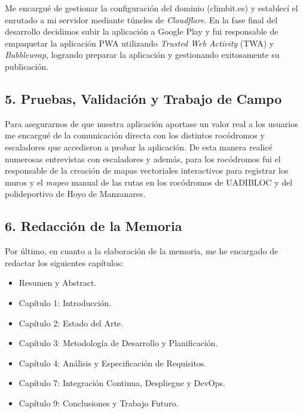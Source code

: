 Me encargué de gestionar la configuración del dominio (climbit.es) y establecí el enrutado a mi servidor mediante túneles de \textit{Cloudflare}. En la fase final del desarrollo decidimos subir la aplicación a Google Play y fui responsable de empaquetar la aplicación PWA utilizando \textit{Trusted Web Activity} (TWA) y \textit{Bubblewrap}, logrando preparar la aplicación y gestionando exitosamente su publicación.

\subsection*{5. Pruebas, Validación y Trabajo de Campo}
Para asegurarnos de que nuestra aplicación aportase un valor real a los usuarios me encargué de la comunicación directa con los distintos rocódromos y escaladores que accedieron a probar la aplicación. De esta manera realicé numerosas entrevistas con escaladores y además, para los rocódromos fui el responsable de la creación de mapas vectoriales interactivos para registrar los muros y el \textit{mapeo} manual de las rutas en los rocódromos de UADIBLOC y del polideportivo de Hoyo de Manzanares.

\subsection*{6. Redacción de la Memoria}
Por último, en cuanto a la elaboración de la memoria, me he encargado de redactar los siguientes capítulos:
\begin{itemize}
    \item Resumen y Abstract.
    \item Capítulo 1: Introducción.
    \item Capítulo 2: Estado del Arte.
    \item Capítulo 3: Metodología de Desarrollo y Planificación.
    \item Capítulo 4: Análisis y Especificación de Requisitos.
    \item Capítulo 7: Integración Continua, Despliegue y DevOps.
    \item Capítulo 9: Conclusiones y Trabajo Futuro.
\end{itemize}